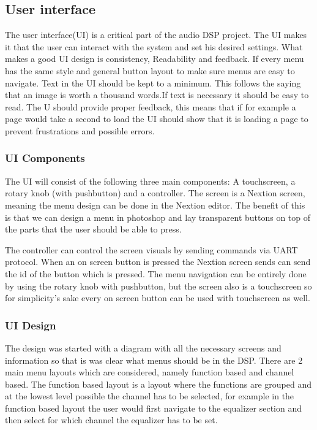 \subsection{User interface}\label{UI_Design}
The user interface(UI) is a critical part of the audio DSP project. The UI makes it that the user can interact with the system and set his desired settings.
What makes a good UI design is consistency, Readability and feedback. If every menu has the same style and general button layout to make sure menus are easy to navigate. Text in the UI should be kept to a minimum. This follows the saying that an image is worth a thousand words.If text is necessary it should be easy to read. The U should provide proper feedback, this means that if for example a page would take a second to load the UI should show that it is loading a page to prevent frustrations and possible errors.

\subsubsection{UI Components}
The UI will consist of the following three main components: A touchscreen, a rotary knob (with pushbutton) and a controller. The screen is a Nextion screen, meaning the menu design can be done in the Nextion editor.
The benefit of this is that we can design a menu in photoshop and lay transparent buttons on top of the parts that the user should be able to press.

The controller can control the screen visuals by sending commands via UART protocol. When an on screen button is pressed the Nextion screen sends can send the id of the button which is pressed. The menu navigation can be entirely done by using the rotary knob with pushbutton, but the screen also is a touchscreen so for simplicity's sake every on screen button can be used with touchscreen as well.

\subsubsection{UI Design}
The design was started with a diagram with all the necessary screens and information so that is was clear what menus should be in the DSP. There are 2 main menu layouts which are considered, namely function based and channel based. The function based layout is a layout where the functions are grouped and at the lowest level possible the channel has to be selected, for example in the function based layout the user would first navigate to the equalizer section and then select for which channel the equalizer has to be set.

